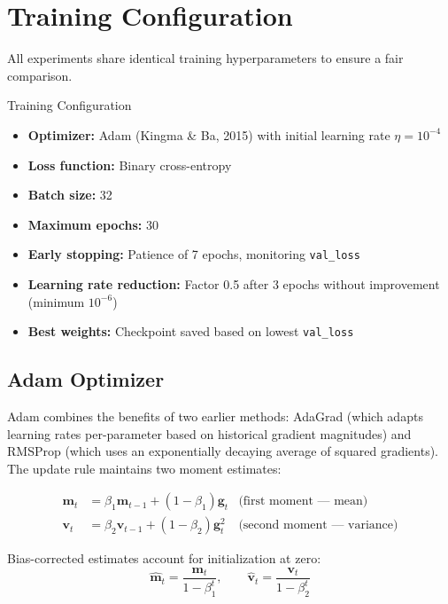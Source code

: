 \documentclass[12pt]{report}
\begin{document}
\section{Training Configuration}

All experiments share identical training hyperparameters to ensure a fair comparison.

\begin{genbox}{Training Configuration}
\begin{itemize}[noitemsep]
    \item \textbf{Optimizer:} Adam (Kingma \& Ba, 2015) with initial learning rate $\eta = 10^{-4}$
    \item \textbf{Loss function:} Binary cross-entropy
    \item \textbf{Batch size:} 32
    \item \textbf{Maximum epochs:} 30
    \item \textbf{Early stopping:} Patience of 7 epochs, monitoring \texttt{val\_loss}
    \item \textbf{Learning rate reduction:} Factor 0.5 after 3 epochs without improvement (minimum $10^{-6}$)
    \item \textbf{Best weights:} Checkpoint saved based on lowest \texttt{val\_loss}
\end{itemize}
\end{genbox}

\subsection{Adam Optimizer}

Adam combines the benefits of two earlier methods: AdaGrad (which adapts learning rates
per-parameter based on historical gradient magnitudes) and RMSProp (which uses an exponentially
decaying average of squared gradients). The update rule maintains two moment estimates:

\begin{align}
    \bm{m}_t &= \beta_1 \bm{m}_{t-1} + (1 - \beta_1) \bm{g}_t & \text{(first moment --- mean)} \\
    \bm{v}_t &= \beta_2 \bm{v}_{t-1} + (1 - \beta_2) \bm{g}_t^2 & \text{(second moment --- variance)}
\end{align}

Bias-corrected estimates account for initialization at zero:
\begin{equation}
    \hat{\bm{m}}_t = \frac{\bm{m}_t}{1 - \beta_1^t}, \qquad
    \hat{\bm{v}}_t = \frac{\bm{v}_t}{1 - \beta_2^t}
\end{equation}
\end{document}
